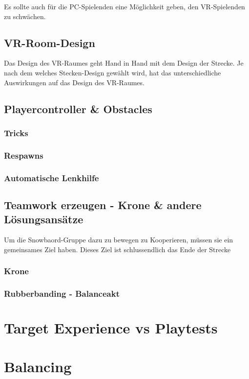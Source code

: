 Es sollte auch für die PC-Spielenden eine Möglichkeit geben, den VR-Spielenden zu schwächen.

\subsection{VR-Room-Design}

Das Design des VR-Raumes geht Hand in Hand mit dem Design der Strecke. Je nach dem welches Stecken-Design gewählt wird, hat das unterschiedliche Auswirkungen auf das Design des VR-Raumes.

\subsection{Playercontroller \& Obstacles\label{_playercontroller}}
\subsubsection{Tricks}
\subsubsection{Respawns}
\subsubsection{Automatische Lenkhilfe}


\subsection{Teamwork erzeugen - Krone \& andere Lösungsansätze\label{_teamwork_erzeugen}}
Um die Snowbaord-Gruppe dazu zu bewegen zu Kooperieren, müssen sie ein gemeinsames Ziel haben. Dieses Ziel ist schlussendlich das Ende der Strecke


\subsubsection{Krone}

\subsubsection{Rubberbanding - Balanceakt}

\section{Target Experience vs Playtests}

\section{Balancing}
